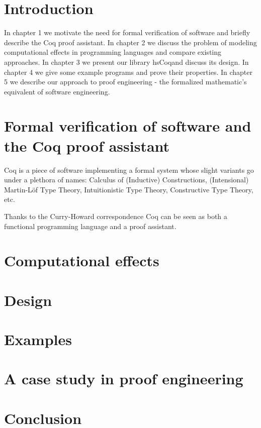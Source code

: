 \documentclass[declaration,inz,english,shortabstract]{iithesis}
\author         {Zeimer}
\date           {czerwiec 2019}                     %
\newcommand{\libname}{hsCoq}
\begin{document}

\chapter{Introduction}

In chapter 1 we motivate the need for formal verification of software and briefly describe the Coq proof assistant. In chapter 2 we discuss the problem of modeling computational effects in programming languages and compare existing approaches. In chapter 3 we present our library \libname and discuss its design. In chapter 4 we give some example programs and prove their properties. In chapter 5 we describe our approach to proof engineering - the formalized mathematic's equivalent of software engineering.

\chapter{Formal verification of software and the Coq proof assistant}



Coq \cite{Coq} is a piece of software implementing a formal system whose slight variants go under a plethora of names: Calculus of (Inductive) Constructions, (Intensional) Martin-L\"of Type Theory, Intuitionistic Type Theory, Constructive Type Theory, etc.

Thanks to the Curry-Howard correspondence \cite{CH} Coq can be seen as both a functional programming language and a proof assistant.



\chapter{Computational effects}

\chapter{Design}

\chapter{Examples}

\chapter{A case study in proof engineering}

\chapter{Conclusion}
\end{document}
